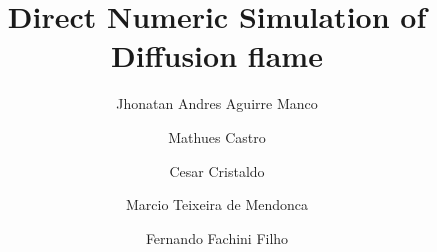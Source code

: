 \documentclass[preprint,12pt,authoryear]{elsarticle}
\begin{document}

\begin{frontmatter}




\title{Direct Numeric Simulation of Diffusion flame}



\author{Jhonatan Andres Aguirre Manco}

\author{Mathues Castro}
\author{Cesar Cristaldo}
\author{Marcio Teixeira de Mendonca}
\author{Fernando Fachini Filho}



\end{frontmatter}
\end{document}
